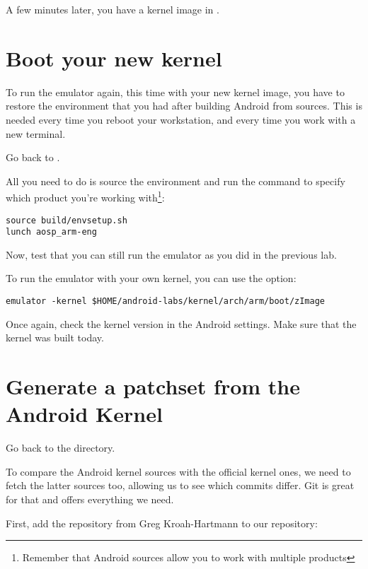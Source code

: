 
A few minutes later, you have a kernel image in .

\section{Boot your new kernel}

To run the emulator again, this time with your new kernel image, you
have to restore the environment that you had after building Android
from sources. This is needed every time you reboot your workstation,
and every time you work with a new terminal.

Go back to .

All you need to do is source the environment and run the 
command to specify which product you're working with\footnote
{Remember that Android sources allow you to work with
  multiple products}:

\begin{verbatim}
source build/envsetup.sh
lunch aosp_arm-eng
\end{verbatim}

Now, test that you can still run the emulator as you did in the
previous lab.

To run the emulator with your own kernel, you can use the
 option:

\begin{verbatim}
emulator -kernel $HOME/android-labs/kernel/arch/arm/boot/zImage
\end{verbatim}

Once again, check the kernel version in the Android settings. Make
sure that the kernel was built today.

\section{Generate a patchset from the Android Kernel}

Go back to the  directory.

To compare the Android kernel sources with the official kernel ones,
we need to fetch the latter sources too, allowing us to see which
commits differ. Git is great for that and offers everything we need.

First, add the  repository from Greg Kroah-Hartmann
to our repository:


